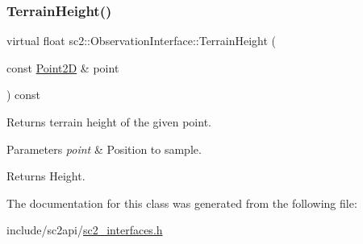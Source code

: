 \subsubsection{\texorpdfstring{Terrain\+Height()}{TerrainHeight()}}
{\footnotesize\ttfamily virtual float sc2\+::\+Observation\+Interface\+::\+Terrain\+Height (\begin{DoxyParamCaption}\item[{const \hyperlink{structsc2_1_1_point2_d}{Point2D} \&}]{point }\end{DoxyParamCaption}) const\hspace{0.3cm}{\ttfamily [pure virtual]}}

Returns terrain height of the given point. 
\begin{DoxyParams}{Parameters}
{\em point} & Position to sample. \\
\hline
\end{DoxyParams}
\begin{DoxyReturn}{Returns}
Height. 
\end{DoxyReturn}


The documentation for this class was generated from the following file\+:\begin{DoxyCompactItemize}
\item 
include/sc2api/\hyperlink{sc2__interfaces_8h}{sc2\+\_\+interfaces.\+h}\end{DoxyCompactItemize}
